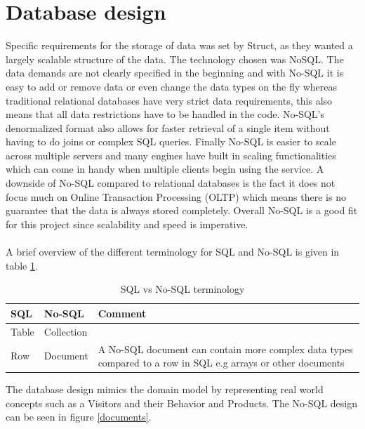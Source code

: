 \section{Database design}
Specific requirements for the storage of data was set by Struct, as they wanted a largely scalable structure of the data. The technology chosen was \gls{NoSQL}.
The data demands are not clearly specified in the beginning and with No-SQL it is easy to add or remove data or even change the data types on the fly whereas traditional relational databases have very strict data requirements, this also means that all data restrictions have to be handled in the code. No-SQL's denormalized format also allows for faster retrieval of a single item without having to do joins or complex SQL queries. Finally No-SQL is easier to scale across multiple servers and many engines have built in scaling functionalities \cite{SQLvsNOSQL} which can come in handy when multiple clients begin using the service. A downside of No-SQL compared to relational databases is the fact it does not focus much on Online Transaction Processing (OLTP) which means there is no guarantee that the data is always stored completely. Overall No-SQL is a good fit for this project since scalability and speed is imperative. \\\\

A brief overview of the different terminology for SQL and No-SQL is given in table \ref{sqlvsnosql_table}.
\begin{table}[H]
	\centering
	\caption{SQL vs No-SQL terminology}
	\label{sqlvsnosql_table}
	\begin{tabular}{|l|l|p{8cm}|}
		\hline
		\textbf{SQL}   & \textbf{No-SQL}     & \textbf{Comment}                                                                                                    \\ \hline
		Table & Collection &                                                                                                            \\ \hline
		Row   & Document   & A No-SQL document can contain more complex data types compared to a row in SQL e.g arrays or other documents \\
		\hline
	\end{tabular}
\end{table}

The database design mimics the domain model by representing real world concepts such as a Visitors and their Behavior and Products. The No-SQL design can be seen in figure \ref{documents}.

